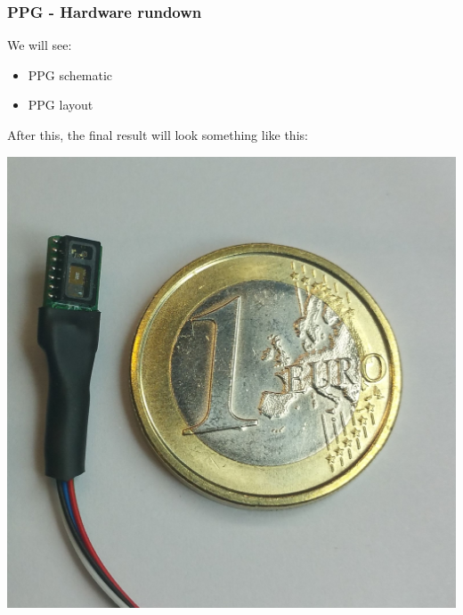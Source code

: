 \documentclass[11pt,xcolor=table,aspectratio=169]{beamer}
\begin{document}
	\begin{frame}
		\frametitle{PPG - Hardware rundown}
		We will see:
		\begin{itemize}
			\item PPG schematic
			\item PPG layout
		\end{itemize}
		After this, the final result will look something like this:
		\begin{center}
			\includegraphics[width=.30\textwidth]{media/PPG.jpg}
		\end{center}
	\end{frame}
\end{document}
